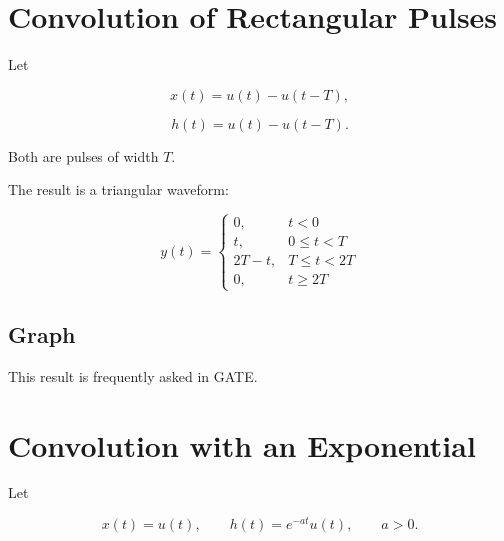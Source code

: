 
\section{Convolution of Rectangular Pulses}

Let

\[
x(t)=u(t)-u(t-T),
\]

\[
h(t)=u(t)-u(t-T).
\]

Both are pulses of width \(T\).

The result is a triangular waveform:

\[
\boxed{
y(t)=
\begin{cases}
0, & t<0\\
t, & 0\le t<T\\
2T-t, & T\le t<2T\\
0, & t\ge2T
\end{cases}
}
\]


\subsection{Graph}

\begin{center}
\end{center}

This result is frequently asked in GATE.


\section{Convolution with an Exponential}

Let

\[
x(t)=u(t),
\qquad
h(t)=e^{-at}u(t),
\qquad a>0.
\]


